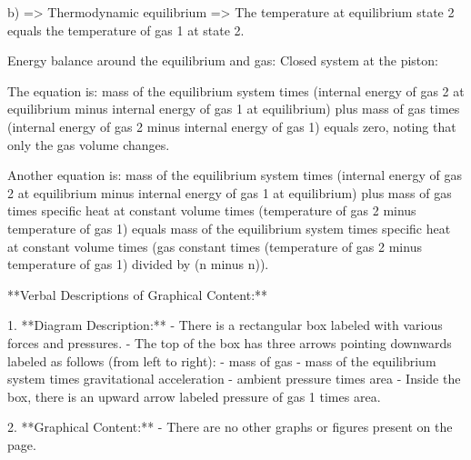 b) 
=> Thermodynamic equilibrium => The temperature at equilibrium state 2 equals the temperature of gas 1 at state 2.

Energy balance around the equilibrium and gas:
Closed system at the piston:

The equation is:
mass of the equilibrium system times (internal energy of gas 2 at equilibrium minus internal energy of gas 1 at equilibrium) plus mass of gas times (internal energy of gas 2 minus internal energy of gas 1) equals zero, noting that only the gas volume changes.

Another equation is:
mass of the equilibrium system times (internal energy of gas 2 at equilibrium minus internal energy of gas 1 at equilibrium) plus mass of gas times specific heat at constant volume times (temperature of gas 2 minus temperature of gas 1) equals mass of the equilibrium system times specific heat at constant volume times (gas constant times (temperature of gas 2 minus temperature of gas 1) divided by (n minus n)).

**Verbal Descriptions of Graphical Content:**

1. **Diagram Description:**
   - There is a rectangular box labeled with various forces and pressures.
   - The top of the box has three arrows pointing downwards labeled as follows (from left to right):
     - mass of gas
     - mass of the equilibrium system times gravitational acceleration
     - ambient pressure times area
   - Inside the box, there is an upward arrow labeled pressure of gas 1 times area.

2. **Graphical Content:**
   - There are no other graphs or figures present on the page.
